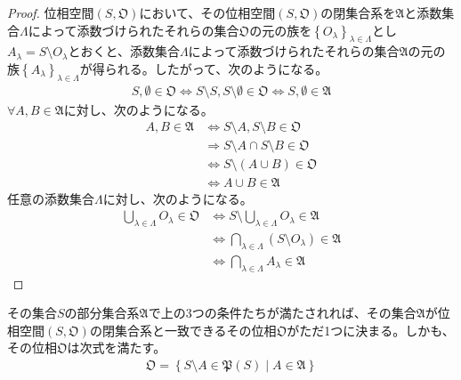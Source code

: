 \documentclass[dvipdfmx]{jsarticle}
\begin{document}
\begin{proof}
位相空間$(S,\mathfrak{O})$において、その位相空間$(S,\mathfrak{O})$の閉集合系を$\mathfrak{A}$と添数集合$\varLambda$によって添数づけられたそれらの集合$\mathfrak{O}$の元の族を$\left\{ O_{\lambda} \right\}_{\lambda \in \varLambda}$とし$A_{\lambda} = S \setminus O_{\lambda}$とおくと、添数集合$\varLambda$によって添数づけられたそれらの集合$\mathfrak{A}$の元の族$\left\{ A_{\lambda} \right\}_{\lambda \in \varLambda}$が得られる。したがって、次のようになる。
\begin{align*}
S,\emptyset \in \mathfrak{O \Leftrightarrow}S \setminus S,S \setminus \emptyset \in \mathfrak{O \Leftrightarrow}S,\emptyset \in \mathfrak{A}
\end{align*}
$\forall A,B \in \mathfrak{A}$に対し、次のようになる。
\begin{align*}
A,B \in \mathfrak{A} &\Leftrightarrow S \setminus A,S \setminus B \in \mathfrak{O}\\
&\Rightarrow S \setminus A \cap S \setminus B \in \mathfrak{O}\\
&\Leftrightarrow S \setminus (A \cup B)\in \mathfrak{O}\\
&\Leftrightarrow A \cup B \in \mathfrak{A}
\end{align*}
任意の添数集合$\varLambda$に対し、次のようになる。
\begin{align*}
\bigcup_{\lambda \in \varLambda} O_{\lambda}\in \mathfrak{O} &\Leftrightarrow S \setminus \bigcup_{\lambda \in \varLambda} O_{\lambda}\in \mathfrak{A}\\
&\Leftrightarrow \bigcap_{\lambda \in \varLambda} \left( S \setminus O_{\lambda} \right)\in \mathfrak{A}\\
&\Leftrightarrow \bigcap_{\lambda \in \varLambda} A_{\lambda}\in \mathfrak{A}
\end{align*}
\end{proof}
\begin{thm}\label{8.1.1.5}
その集合$S$の部分集合系$\mathfrak{A}$で上の3つの条件たちが満たされれば、その集合$\mathfrak{A}$が位相空間$\left( S,\mathfrak{O} \right)$の閉集合系と一致できるその位相$\mathfrak{O}$がただ1つに決まる。しかも、その位相$\mathfrak{O}$は次式を満たす。
\begin{align*}
\mathfrak{O}=\left\{ S \setminus A \in \mathfrak{P}(S) \middle| A \in \mathfrak{A} \right\}
\end{align*}
\end{thm}
\end{document}
